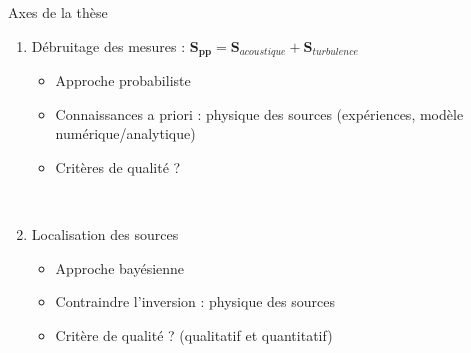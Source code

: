 \begin{frame}{Axes de la thèse}
	\begin{enumerate}
		\item Débruitage des mesures : $\bm{S_{pp}} = \bm{S}_{acoustique} + \bm{S}_{turbulence}$\\
			\begin{itemize}
				\item Approche probabiliste
				\item Connaissances a priori : physique des sources (expériences, modèle numérique/analytique)
				\item Critères de qualité ?
			\end{itemize}~\\
		\item Localisation des sources
			\begin{itemize}
				\item  Approche bayésienne
				\item Contraindre l'inversion : physique des sources
				\item Critère de qualité ? (qualitatif et quantitatif)
			\end{itemize}
	\end{enumerate}
\end{frame}




